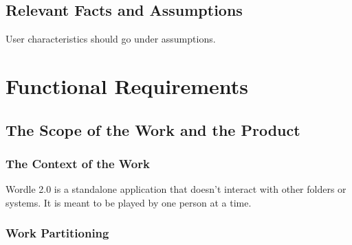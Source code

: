 \documentclass[12pt, titlepage]{article}
\begin{document}
\subsection{Relevant Facts and Assumptions}

User characteristics should go under assumptions.

\section{Functional Requirements}

\subsection{The Scope of the Work and the Product}

\subsubsection{The Context of the Work}
Wordle 2.0 is a standalone application that doesn't interact with other folders or systems. It is meant to be played by one person at a time.
\newpage
\subsubsection{Work Partitioning}
\end{document}
